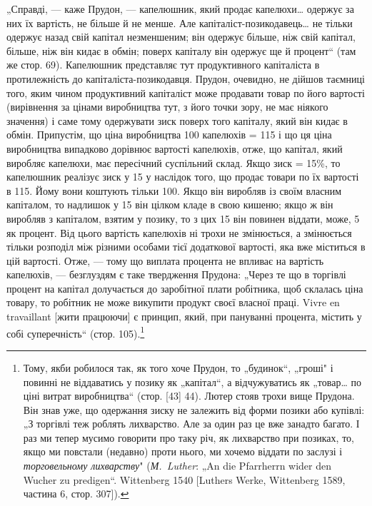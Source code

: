 „Справді, — каже Прудон, — капелюшник, який продає капелюхи\dots{}
одержує за них їх вартість, не більше й не менше. Але
капіталіст-позикодавець\dots{} не тільки одержує назад свій капітал
незменшеним; він одержує більше, ніж свій капітал, більше, ніж
він кидає в обмін; поверх капіталу він одержує ще й процент“
(там же стор. 69). Капелюшник представляє тут продуктивного
капіталіста в протилежність до капіталіста-позикодавця.
Прудон, очевидно, не дійшов таємниці того, яким чином продуктивний
капіталіст може продавати товар по його вартості (вирівнення
за цінами виробництва тут, з його точки зору, не має
ніякого значення) і саме тому одержувати зиск поверх того капіталу,
який він кидає в обмін. Припустім, що ціна виробництва
100 капелюхів = 115 і що ця ціна виробництва
випадково дорівнює вартості капелюхів, отже, що капітал,
який виробляє капелюхи, має пересічний суспільний склад.
Якщо зиск = 15\%, то капелюшник реалізує зиск у 15
у наслідок того, що продає товари по їх вартості в 115.
Йому вони коштують тільки 100. Якщо він
виробляв із своїм власним капіталом, то надлишок у 15 він цілком кладе в свою кишеню; якщо ж він виробляв
з капіталом, взятим у позику, то з цих 15
він повинен віддати, може, 5 як процент.
Від цього вартість капелюхів ні трохи не змінюється, а змінюється
тільки розподіл між різними особами тієї додаткової
вартості, яка вже міститься в цій вартості. Отже, — тому що
виплата процента не впливає на вартість капелюхів, — безглуздям
є таке твердження Прудона: „Через те що в торгівлі процент
на капітал долучається до заробітної плати робітника, щоб склалась
ціна товару, то робітник не може викупити продукт своєї
власної праці. Vivre en travaillant [жити працюючи] є принцип,
який, при пануванні процента, містить у собі суперечність“
(стор. 105).\footnote{
Тому, якби робилося так, як того хоче Прудон, то „будинок“, „гроші"
і~ повинні не віддаватись у позику як „капітал“, а відчужуватись як „товар\dots{}
по ціні витрат виробництва“ (стор. [43] 44). Лютер стояв трохи вище
Прудона. Він знав уже, що одержання зиску не залежить від форми позики
або купівлі: „З торгівлі теж роблять лихварство. Але за один раз це вже занадто
багато. І раз ми тепер мусимо говорити про таку річ, як лихварство
при позиках, то, якщо ми повстали (недавно) проти нього, ми хочемо віддати
по заслузі і \emph{торговельному лихварству}" (\emph{М.~Luther}: „An die Pfarrherrn wider
den Wucher zu predigen“. Wittenberg 1540 [Luthers Werke, Wittenberg 1589, частина
6, стор. 307]).
}

